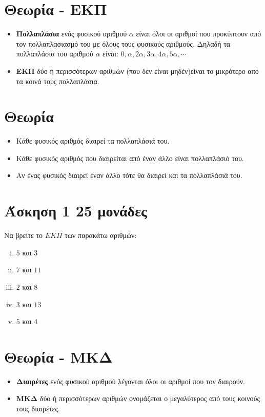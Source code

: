 \documentclass[a4paper,10pt]{report}
\begin{document}
\section*{Θεωρία - ΕΚΠ \hfill \small{}}
\begin{itemize}
 \item \textbf{Πολλαπλάσια} ενός φυσικού αριθμού $α$ είναι όλοι οι αριθμοί που προκύπτουν από τον 
       πολλαπλασιασμό του με όλους τους φυσικούς αριθμούς.
       Δηλαδή τα πολλαπλάσια του αριθμού $α$ είναι: $0,α,2α,3α,4α,5α,\cdots$
 \item \textbf{ΕΚΠ} δύο ή περισσότερων αριθμών (που δεν είναι μηδέν)είναι το μικρότερο από τα κοινά τους πολλαπλάσια.
\end{itemize}

\section*{Θεωρία \hfill \small{}}
\begin{itemize}
 \item Κάθε φυσικός αριθμός διαιρεί τα πολλαπλάσιά του.
 \item Κάθε φυσικός αριθμός που διαιρείται από έναν άλλο είναι πολλαπλάσιό του.
 \item Αν ένας φυσικός διαιρεί έναν άλλο τότε θα διαιρεί και τα πολλαπλάσιά του.
\end{itemize}



\section*{Άσκηση 1  \hfill \small{25 μονάδες}}
Να βρείτε το $ΕΚΠ$ των παρακάτω αριθμών:
\begin{enumerate}[i)]
 \item $5$ και $3$
 \item $7$ και $11$
 \item $2$ και $8$
 \item $3$ και $13$
 \item $5$ και $4$
\end{enumerate}


\section*{Θεωρία - ΜΚΔ \hfill \small{}}
\begin{itemize}
 \item \textbf{Διαιρέτες } ενός φυσικού αριθμού λέγονται όλοι οι αριθμοί που τον διαιρούν.
 \item \textbf{ΜΚΔ} δύο ή περισσότερων αριθμών ονομάζεται ο μεγαλύτερος από τους κοινούς τους διαιρέτες.
\end{itemize}
\end{document}
